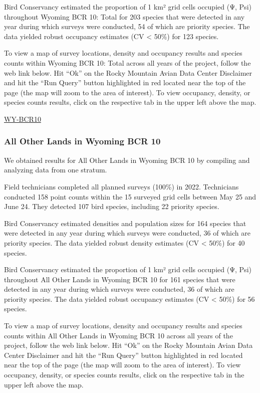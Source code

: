 \documentclass[
  letterpaper,
  DIV=11,
  numbers=noendperiod,
  oneside]{scrreprt}
\begin{document}
Bird Conservancy estimated the proportion of 1 km² grid cells occupied
(Ψ, Psi) throughout Wyoming BCR 10: Total for 203 species that were
detected in any year during which surveys were conducted, 54 of which
are priority species. The data yielded robust occupancy estimates (CV
\textless{} 50\%) for 123 species.

To view a map of survey locations, density and occupancy results and
species counts within Wyoming BCR 10: Total across all years of the
project, follow the web link below. Hit ``Ok'' on the Rocky Mountain
Avian Data Center Disclaimer and hit the ``Run Query'' button
highlighted in red located near the top of the page (the map will zoom
to the area of interest). To view occupancy, density, or species counts
results, click on the respective tab in the upper left above the map.

\href{http://www.rmbo.org/new_site/adc/QueryWindow.aspx\#N4IgzgrgDgpgTmALnAhoiBbEAuABCAdQE0BaAIQGEAlARgAYQBfIA===}{WY-BCR10}

\hypertarget{all-other-lands-in-wyoming-bcr-10}{%
\subsubsection{All Other Lands in Wyoming BCR
10}\label{all-other-lands-in-wyoming-bcr-10}}

We obtained results for All Other Lands in Wyoming BCR 10 by compiling
and analyzing data from one stratum.

Field technicians completed all planned surveys (100\%) in 2022.
Technicians conducted 158 point counts within the 15 surveyed grid cells
between May 25 and June 24. They detected 107 bird species, including 22
priority species.

Bird Conservancy estimated densities and population sizes for 164
species that were detected in any year during which surveys were
conducted, 36 of which are priority species. The data yielded robust
density estimates (CV \textless{} 50\%) for 40 species.

Bird Conservancy estimated the proportion of 1 km² grid cells occupied
(Ψ, Psi) throughout All Other Lands in Wyoming BCR 10 for 161 species
that were detected in any year during which surveys were conducted, 36
of which are priority species. The data yielded robust occupancy
estimates (CV \textless{} 50\%) for 56 species.

To view a map of survey locations, density and occupancy results and
species counts within All Other Lands in Wyoming BCR 10 across all years
of the project, follow the web link below. Hit ``Ok'' on the Rocky
Mountain Avian Data Center Disclaimer and hit the ``Run Query'' button
highlighted in red located near the top of the page (the map will zoom
to the area of interest). To view occupancy, density, or species counts
results, click on the respective tab in the upper left above the map.
\end{document}
